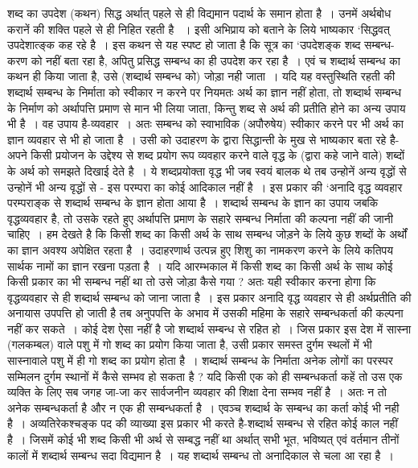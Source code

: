 {शब्द का उपदेश (कथन) सिद्ध अर्थात् पहले से ही विद्यमान पदार्थ के समान होता है~। उनमें अर्थबोध करानें की शक्ति पहले से ही निहित रहती है ~। इसी अभिप्राय को बताने के लिये भाष्यकार ‘सिद्धवत् उपदेशात्ङ्क कह रहे है~। इस कथन से यह स्पष्ट हो जाता है कि सूत्र का ‘उपदेशङ्क शब्द सम्बन्ध-करण को नहीं बता रहा है, अपितु प्रसिद्ध सम्बन्ध का ही उपदेश कर रहा है~। एवं च शब्दार्थ सम्बन्ध का कथन ही किया जाता है, उसे (शब्दार्थ सम्बन्ध को) जोड़ा नही जाता~। यदि यह वस्तुस्थिति रहती की शब्दार्थ सम्बन्ध के निर्माता को स्वीकार न करने पर नियमतः अर्थ का ज्ञान नहीं होता, तो शब्दार्थ सम्बन्ध के निर्माण को अर्थापत्ति प्रमाण से मान भी लिया जाता, किन्तु शब्द से अर्थ की प्रतीति होने का अन्य उपाय भी है~। वह उपाय है-व्यवहार~। अतः सम्बन्ध को स्वाभाविक (अपौरुषेय) स्वीकार करने पर भी अर्थ का ज्ञान व्यवहार से भी हो जाता है~। उसी को उदाहरण के द्वारा सिद्धान्ती  के मुख से भाष्यकार बता रहे है-अपने किसी प्रयोजन के उद्देश्य से शब्द प्रयोग रूप व्यवहार करने वाले वृद्ध के (द्वारा कहे जाने वाले) शब्दों के अर्थ को समझते दिखाई देते है~। ये शब्दप्रयोक्ता  वृद्ध भी जब स्वयं बालक थे तब उन्होनें अन्य वृद्धों से उन्होनें भी अन्य वृद्धों से - इस परम्परा का कोई आदिकाल नहीं है~। इस प्रकार की ‘अनादि वृद्ध व्यवहार परम्पराङ्क से शब्दार्थ सम्बन्ध के ज्ञान होता आया है~। शब्दार्थ सम्बन्ध के ज्ञान का उपाय जबकि वृद्धव्यवहार है, तो उसके रहते हुए अर्थापत्ति प्रमाण के सहारे सम्बन्ध निर्माता की कल्पना नहीं की जानी चाहिए~। हम देखते है कि किसी शब्द का किसी अर्थ के साथ सम्बन्ध जोड़ने के लिये कुछ शब्दों के अर्थों का ज्ञान अवश्य अपेक्षित रहता है~। उदाहरणार्थ उत्पन्न हुए शिशु का नामकरण करने के लिये कतिपय सार्थक नामों का ज्ञान रखना पड़ता है~। यदि आरम्भकाल में किसी शब्द का किसी अर्थ के साथ कोई किसी प्रकार का भी सम्बन्ध नहीं था तो उसे जोड़ा कैसे गया ? अतः यही स्वीकार करना होगा कि वृद्धव्यवहार से ही शब्दार्थ सम्बन्ध को जाना जाता है~। इस प्रकार अनादि वृद्ध व्यवहार से ही अर्थप्रतीति की अनायास उपपत्ति हो जाती है तब अनुपपत्ति के अभाव में उसकी महिमा के सहारे सम्बन्धकर्ता की कल्पना नहीं कर सकते~। कोई देश ऐसा नहीं है जो शब्दार्थ सम्बन्ध से रहित हो~। जिस प्रकार इस देश में सास्ना (गलकम्बल) वाले पशु में गो शब्द का प्रयोग किया जाता है, उसी प्रकार समस्त दुर्गम स्थलों में भी सास्नावाले पशु में ही गो शब्द का प्रयोग होता है~। शब्दार्थ सम्बन्ध के निर्माता अनेक लोगों का परस्पर सम्मिलन दुर्गम स्थानों में कैसे सम्भव हो सकता है ? यदि किसी एक को ही सम्बन्धकर्ता कहें तो उस एक व्यक्ति के लिए सब जगह जा-जा कर सार्वजनीन व्यवहार की शिक्षा देना सम्भव नहीं है~। अतः न तो अनेक  सम्बन्धकर्ता है और न एक ही सम्बन्धकर्ता है~। एवञ्च शब्दार्थ के सम्बन्ध का कर्ता कोई भी नही है~। अव्यतिरेकश्चङ्क पद की व्याख्या इस प्रकार भी करते है-शब्दार्थ सम्बन्ध से रहित कोई काल नहीं है~। जिसमें कोई भी शब्द किसी भी अर्थ से सम्बद्ध  नहीं था अर्थात् सभी भूत, भविष्यत् एवं वर्तमान तीनों कालों में शब्दार्थ सम्बन्ध सदा विद्यमान है~। यह शब्दार्थ सम्बन्ध तो अनादिकाल से चला आ रहा है~।

}
